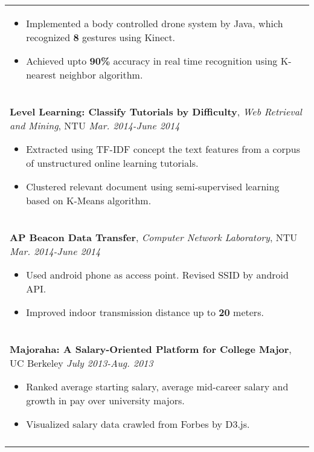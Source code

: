 \documentclass[a4paper,10pt]{article} %
\begin{document}
{\begin{tabular}{p{16cm}}
\vspace{0.5mm}
\begin{itemize}
\item Implemented a body controlled drone system by Java, which recognized \textbf{8} gestures using Kinect.
\item Achieved upto \textbf{90\%} accuracy in real time recognition using K-nearest neighbor algorithm.\vspace*{-\baselineskip}
\end{itemize} \\
\vspace{0.5mm}

\normalsize\textbf{Level Learning: Classify Tutorials by Difficulty}, {\it{Web Retrieval and Mining}}, NTU \hfill {\it Mar. 2014-June 2014}
\vspace{0.5mm}
\begin{itemize}
\item Extracted using TF-IDF concept the text features from a corpus of unstructured online learning tutorials.
\item Clustered relevant document using semi-supervised learning based on K-Means algorithm.\vspace*{-\baselineskip}
\end{itemize}\\
\vspace{0.5mm}

\normalsize\textbf{AP Beacon Data Transfer}, {\it{Computer Network Laboratory}}, NTU  \hfill {\it Mar. 2014-June 2014}
\vspace{0.5mm}
\begin{itemize}
\item Used android phone as access point. Revised SSID by android API.
\item Improved indoor transmission distance up to \textbf{20} meters. \vspace*{-\baselineskip}
\end{itemize}\\
\vspace{0.5mm}

\normalsize\textbf{Majoraha: A Salary-Oriented Platform for College Major}, UC Berkeley \hfill  {\it July 2013-Aug. 2013}
\vspace{0.5mm}
\begin{itemize}
\item Ranked average starting salary, average mid-career salary and growth in pay over university majors.
\item Visualized salary data crawled from Forbes by D3.js. \vspace*{-\baselineskip}
\end{itemize}\\
\vspace{0.5mm}


\end{tabular}}
\end{document}
